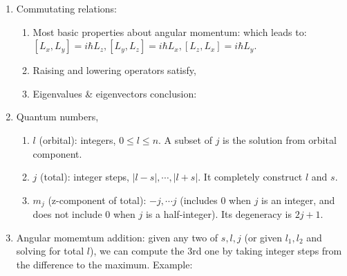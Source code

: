 \documentclass{school-22.101-notes}
\begin{document}
\clearpage
{} 
\begin{enumerate}
\item Commutating relations: 
  \begin{enumerate}
  \item Most basic properties about angular momentum:
    which leads to: $[L_x, L_y] = i \hbar L_z, [L_y, L_z] = i \hbar L_x, [L_z, L_x] = i \hbar L_y$. 

  \item Raising and lowering operators satisfy,

  \item Eigenvalues \& eigenvectors conclusion: 
  \end{enumerate}

\item Quantum numbers, 
  \begin{enumerate}
  \item $l$ (orbital): integers, $0 \le l \le n$. A subset of $j$ is the solution from orbital component. 
  \item $j$ (total): integer steps, $|l-s|, \cdots, |l+s|$. It completely construct $l$ and $s$. 
  \item $m_j$ (z-component of total): $-j, \cdots j$ (includes 0 when $j$ is an integer, and does not include 0 when $j$ is a half-integer). Its degeneracy is $2j+1$. 
  \end{enumerate}

\item Angular momemtum addition: given any two of $s, l, j$ (or given $l_1, l_2$ and solving for total $l$), we can compute the 3rd one by taking integer steps from the difference to the maximum. Example: 
\end{enumerate}
\end{document}

